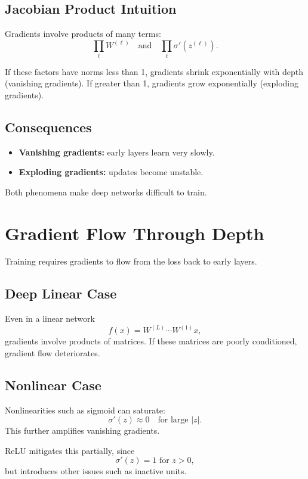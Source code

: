 \subsection{Jacobian Product Intuition}

Gradients involve products of many terms:
\[
\prod_{\ell} W^{(\ell)} \quad \text{and} \quad \prod_{\ell} \sigma'(z^{(\ell)}).
\]

If these factors have norms less than 1, gradients shrink exponentially with depth (vanishing gradients).  
If greater than 1, gradients grow exponentially (exploding gradients).

\subsection{Consequences}

\begin{itemize}
    \item \textbf{Vanishing gradients:} early layers learn very slowly.
    \item \textbf{Exploding gradients:} updates become unstable.
\end{itemize}

Both phenomena make deep networks difficult to train.

\section{Gradient Flow Through Depth}

Training requires gradients to flow from the loss back to early layers.

\subsection{Deep Linear Case}

Even in a linear network
\[
f(x)=W^{(L)}\cdots W^{(1)}x,
\]
gradients involve products of matrices. If these matrices are poorly conditioned, gradient flow deteriorates.

\subsection{Nonlinear Case}

Nonlinearities such as sigmoid can saturate:
\[
\sigma'(z)\approx 0 \quad \text{for large } |z|.
\]
This further amplifies vanishing gradients.

ReLU mitigates this partially, since
\[
\sigma'(z)=1 \text{ for } z>0,
\]
but introduces other issues such as inactive units.

